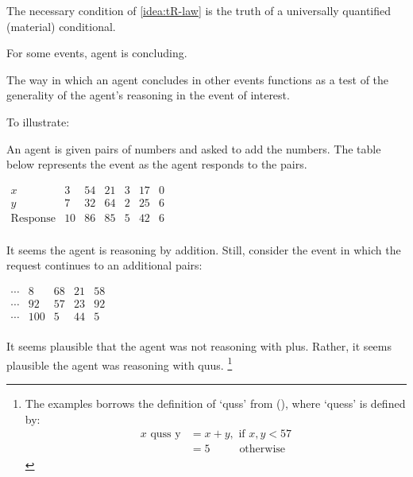 \begin{note}
  \noindent%
  The necessary condition of \autoref{idea:tR-law} is the truth of a universally quantified (material) conditional.

  For some events, agent is concluding.

  The way in which an agent concludes in other events functions as a test of the generality of the agent's reasoning in the event of interest.

  To illustrate:

  \begin{illustration}[Numbers]
    \label{illu:quus}
    An agent is given pairs of numbers and asked to add the numbers.
    The table below represents the event as the agent responds to the pairs.

    \medskip
    \hspace{2.8em}%
    \(
      \begin{array}{ccccccc}
      x & 3 & 54 & 21 & 3 & 17 & 0 \\
      y & 7 & 32 & 64 & 2 & 25 & 6 \\
      \hline
      \text{Response} & 10 & 86 & 85 & 5 & 42 & 6 \\
    \end{array}
    \)
    \medskip

    \noindent%
    It seems the agent is reasoning by addition.
    Still, consider the event in which the request continues to an additional pairs:

    \medskip
    \hfill%
    \(
    \begin{array}{ccccc}
      \cdots & 8 & 68 & 21 & 58 \\
      \cdots & 92 & 57 & 23 & 92 \\
      \hline
      \cdots & 100 & 5 & 44 & 5 \\
    \end{array}
    \)%
    \hspace{2.8em}%
    \medskip

    \noindent%
    It seems plausible that the agent was not reasoning with plus.
    Rather, it seems plausible the agent was reasoning with quus.%
    \footnote{
      The examples borrows the definition of `quss' from \citeauthor{Kripke:1982aa} (\citeyear{Kripke:1982aa}), where `quess' is defined by:
      \begin{align*}
        x \text{ quss y} &= x + y, \text{ if } x,y < 57 \\
                         &= 5 \phantom{ if x,,} \text{ otherwise }
      \end{align*}
      \vspace{-\baselineskip}
    }


\end{illustration}
\end{note}
